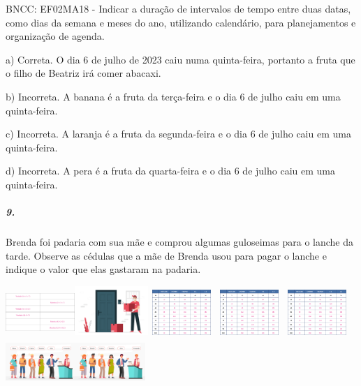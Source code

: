 BNCC: EF02MA18 - Indicar a duração de intervalos de tempo entre duas
datas, como dias da semana e meses do ano, utilizando calendário, para
planejamentos e organização de agenda.

a) Correta. O dia 6 de julho de 2023 caiu numa quinta-feira, portanto a
fruta que o filho de Beatriz irá comer abacaxi.

b) Incorreta. A banana é a fruta da terça-feira e o dia 6 de julho caiu
em uma quinta-feira.

c) Incorreta. A laranja é a fruta da segunda-feira e o dia 6 de julho
caiu em uma quinta-feira.

d) Incorreta. A pera é a fruta da quarta-feira e o dia 6 de julho caiu
em uma quinta-feira.

\subparagraph{9. }\label{section-138}

Brenda foi padaria com sua mãe e comprou algumas guloseimas para o
lanche da tarde. Observe as cédulas que a mãe de Brenda usou para pagar
o lanche e indique o valor que elas gastaram na padaria.

\includegraphics[width=1.02736in,height=0.68704in]{media/image110.png}\includegraphics[width=1.09268in,height=0.73073in]{media/image112.png}\includegraphics[width=1.01042in,height=0.67572in]{media/image111.png}\includegraphics[width=1.01042in,height=0.67572in]{media/image111.png}\includegraphics[width=1.01042in,height=0.67572in]{media/image111.png}\includegraphics[width=1.04264in,height=0.69727in]{media/image113.png}\includegraphics[width=1.04264in,height=0.69727in]{media/image113.png}


